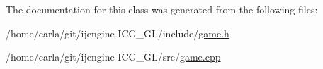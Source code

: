The documentation for this class was generated from the following files\-:\begin{DoxyCompactItemize}
\item 
/home/carla/git/ijengine-\/\-I\-C\-G\-\_\-\-G\-L/include/\hyperlink{game_8h}{game.\-h}\item 
/home/carla/git/ijengine-\/\-I\-C\-G\-\_\-\-G\-L/src/\hyperlink{game_8cpp}{game.\-cpp}\end{DoxyCompactItemize}
